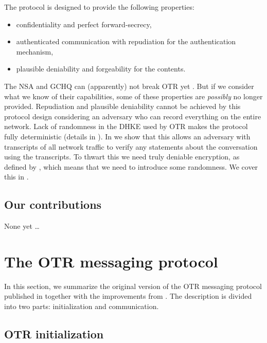The protocol is designed to provide the following properties:
\begin{itemize}
  \item confidentiality and perfect forward-secrecy,
  \item authenticated communication with repudiation for the authentication 
    mechanism,
  \item plausible deniability and forgeability for the contents.
\end{itemize}
The \ac{NSA} and \ac{GCHQ} can (apparently) not break \ac{OTR} yet 
\cite{spiegelotr}.
But if we consider what we know of their capabilities, some of these properties 
are \emph{possibly} no longer provided.
Repudiation and plausible deniability cannot be achieved by this protocol 
design considering an adversary who can record everything on the entire 
network.
Lack of randomness in the \ac{DHKE} \cite{dh} used by \ac{OTR} makes 
the protocol fully deterministic (details in ).
In  we show that this allows an adversary with 
transcripts of all network traffic to verify any statements about the 
conversation using the transcripts.
To thwart this we need truly deniable encryption, as defined by 
\citet{deniablecrypt}, which means that we need to introduce some randomness.
We cover this in .

\subsection{Our contributions}

None yet \dots


\section{The \acs{OTR} messaging protocol}
\label{sec:otr}

In this section, we summarize the original version of the \ac{OTR} messaging 
protocol published in \cite{otr2004} together with the improvements from 
\cite{di2005secure}.
The description is divided into two parts: initialization and communication.

\subsection{\acs{OTR} initialization}

